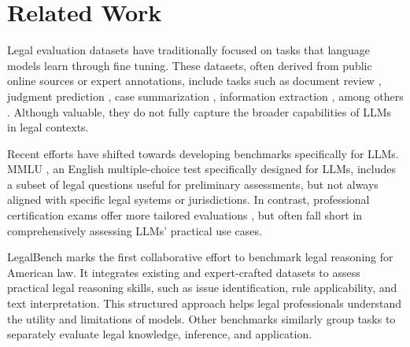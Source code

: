 \section{Related Work}
Legal evaluation datasets have traditionally focused on tasks that language models learn through fine tuning. These datasets, often derived from public online sources or expert annotations, include
tasks such as document review \citep{NEURIPS_DATASETS_AND_BENCHMARKS2021_6ea9ab1b,wang-etal-2023-maud}, judgment prediction \citep{chalkidis-etal-2019-neural,malik-etal-2021-ildc}, case
summarization \citep{NEURIPS2022_552ef803}, information extraction \citep{yao-etal-2022-leven}, among others \citep{chalkidis-etal-2022-lexglue,niklaus-etal-2023-lextreme,NEURIPS2022_d15abd14}. Although valuable, they do not fully capture the broader capabilities of LLMs in legal contexts.

Recent efforts have shifted towards developing benchmarks specifically for LLMs. MMLU \citep{hendrycks2021measuring}, an English multiple-choice test specifically designed for LLMs, includes a subset of legal questions
useful for preliminary assessments, but not always aligned with specific legal systems or jurisdictions. In contrast, professional certification exams offer more tailored
evaluations \citep{Zhong_Xiao_Tu_Zhang_Liu_Sun_2020,doi:10.1098/rsta.2023.0254,junior2024jurulegalbrazilianlarge}, but often fall short in comprehensively assessing LLMs’ practical use cases.

LegalBench \citep{guha2023legalbenchcollaborativelybuiltbenchmark} marks the first collaborative effort to benchmark legal reasoning for American law. It integrates existing and expert-crafted
datasets to assess practical legal reasoning skills, such as issue identification, rule applicability, and
text interpretation. This structured approach helps legal professionals understand the utility and limitations of models. Other benchmarks \citep{fei2023lawbenchbenchmarkinglegalknowledge,dai2024laiwchineselegallarge} similarly group tasks to separately evaluate legal knowledge, inference, and application.